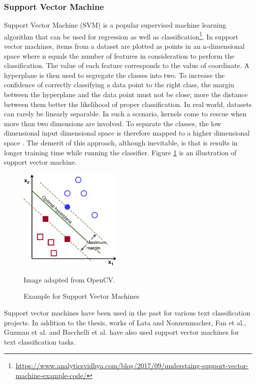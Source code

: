 \documentclass[a4paper,12pt,twoside]{report}
\begin{document}
\subsubsection{Support Vector Machine}
Support Vector Machine (\acs{SVM}) is a popular supervised machine learning algorithm that can be used for regression as well as classification\footnote{\url{https://www.analyticsvidhya.com/blog/2017/09/understaing-support-vector-machine-example-code/}}. In support vector machines, items from a dataset are plotted as points in an n-dimensional space where n equals the number of features in consideration to perform the classification. The value of each feature corresponds to the value of coordinate. A hyperplane is then used to segregate the classes into two. To increase the confidence of correctly classifying a data point to the right class, the margin between the hyperplane and the data point must not be close; more the distance between them better the likelihood of proper classification\cite{Joachims1998a}.  
\newline \newline
In real world, datasets can rarely be linearly separable. In such a scenario, kernels come to rescue when more than two dimensions are involved. To separate the classes, the low dimensional input dimensional space is therefore mapped to a higher dimensional space \cite{Tong2001}. The demerit of this approach, although inevitable, is that is results in longer training time while running the classifier. Figure \ref{fig:svm} is an illustration of support vector machine. 
\begin{figure}[h] %
    \centering
    \includegraphics[width=5cm]{optimal-hyperplane}
    \caption{Example for Support Vector Machines}
    \small Image adapted from OpenCV\footnotemark.
    \label{fig:svm}
\end{figure}
\newline \newline
Support vector machines have been used in the past for various text classification projects. In addition to the thesis, works of Lata \cite{Lata2016} and Nonnenmacher\cite{Nonnenmacher2017}, Fan et al.\cite{Fan2017}, Guzman et al.\cite{Guzman2016} and Bacchelli et al.\cite{Bacchelli2012} have also used support vector machines for text classification tasks. 
\end{document}
